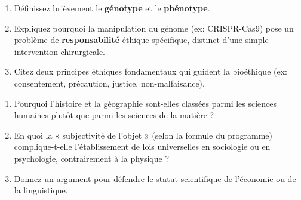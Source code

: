 \documentclass[11pt]{article}
\begin{document}
\begin{exercice}
\begin{enumerate}
    \item Définissez brièvement le \textbf{génotype} et le \textbf{phénotype}.
    \item Expliquez pourquoi la manipulation du génome (ex: CRISPR-Cas9) pose un problème de \textbf{responsabilité} éthique spécifique, distinct d'une simple intervention chirurgicale.
    \item Citez deux principes éthiques fondamentaux qui guident la bioéthique (ex: consentement, précaution, justice, non-malfaisance).
\end{enumerate}
\end{exercice}

\begin{exercice}
\begin{enumerate}
    \item Pourquoi l'histoire et la géographie sont-elles classées parmi les sciences humaines plutôt que parmi les sciences de la matière ?
    \item En quoi la « subjectivité de l'objet » (selon la formule du programme) complique-t-elle l'établissement de lois universelles en sociologie ou en psychologie, contrairement à la physique ?
    \item Donnez un argument pour défendre le statut scientifique de l'économie ou de la linguistique.
\end{enumerate}
\end{exercice}
\end{document}
